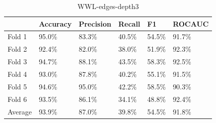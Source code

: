 \documentclass{IEEEtran}
\begin{document}
\begin{table}
    \centering
    \begin{tabular}{l||llll|l}
        \textbf{} & \textbf{Accuracy} & \textbf{Precision} & \textbf{Recall} & \textbf{F1} & \textbf{ROCAUC} \\
        \hline \hline
        Fold 1    & 95.0\%            & 83.3\%             & 40.5\%          & 54.5\%      & 91.7\%          \\
        Fold 2    & 92.4\%            & 82.0\%             & 38.0\%          & 51.9\%      & 92.3\%          \\
        Fold 3    & 94.7\%            & 88.1\%             & 43.5\%          & 58.3\%      & 92.5\%          \\
        Fold 4    & 93.0\%            & 87.8\%             & 40.2\%          & 55.1\%      & 91.5\%          \\
        Fold 5    & 94.6\%            & 95.0\%             & 42.2\%          & 58.5\%      & 90.3\%          \\
        Fold 6    & 93.5\%            & 86.1\%             & 34.1\%          & 48.8\%      & 92.4\%          \\
        \hline
        Average   & 93.9\%            & 87.0\%             & 39.8\%          & 54.5\%      & 91.8\%          \\
    \end{tabular}
    \caption{WWL-edges-depth3}
\end{table}
\end{document}
